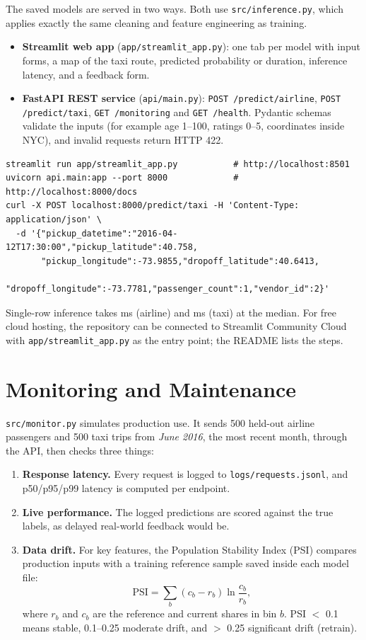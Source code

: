 \documentclass[11pt,a4paper]{article}
\begin{document}
The saved models are served in two ways. Both use \texttt{src/inference.py}, which applies exactly the same cleaning and feature engineering as training.
\begin{itemize}
\item \textbf{Streamlit web app} (\texttt{app/streamlit\_app.py}): one tab per model with input forms, a map of the taxi route, predicted probability or duration, inference latency, and a feedback form.
\item \textbf{FastAPI REST service} (\texttt{api/main.py}): \texttt{POST /predict/airline}, \texttt{POST /predict/taxi}, \texttt{GET /monitoring} and \texttt{GET /health}. Pydantic schemas validate the inputs (for example age 1--100, ratings 0--5, coordinates inside NYC), and invalid requests return HTTP 422.
\end{itemize}
\begin{lstlisting}
streamlit run app/streamlit_app.py           # http://localhost:8501
uvicorn api.main:app --port 8000             # http://localhost:8000/docs
curl -X POST localhost:8000/predict/taxi -H 'Content-Type: application/json' \
  -d '{"pickup_datetime":"2016-04-12T17:30:00","pickup_latitude":40.758,
       "pickup_longitude":-73.9855,"dropoff_latitude":40.6413,
       "dropoff_longitude":-73.7781,"passenger_count":1,"vendor_id":2}'
\end{lstlisting}
\noindent Single-row inference takes \airLatP{} ms (airline) and \taxiLatP{} ms (taxi) at the median. For free cloud hosting, the repository can be connected to Streamlit Community Cloud with \texttt{app/streamlit\_app.py} as the entry point; the README lists the steps.

\section{Monitoring and Maintenance}

\texttt{src/monitor.py} simulates production use. It sends 500 held-out airline passengers and 500 taxi trips from \emph{June 2016}, the most recent month, through the API, then checks three things:
\begin{enumerate}
\item \textbf{Response latency.} Every request is logged to \texttt{logs/requests.jsonl}, and p50/p95/p99 latency is computed per endpoint.
\item \textbf{Live performance.} The logged predictions are scored against the true labels, as delayed real-world feedback would be.
\item \textbf{Data drift.} For key features, the Population Stability Index (PSI) compares production inputs with a training reference sample saved inside each model file:
\begin{equation}\mathrm{PSI}=\sum_{b}(c_b-r_b)\ln\frac{c_b}{r_b},\end{equation}
where $r_b$ and $c_b$ are the reference and current shares in bin $b$. PSI $<$ 0.1 means stable, 0.1--0.25 moderate drift, and $>$ 0.25 significant drift (retrain).
\end{enumerate}
\end{document}
